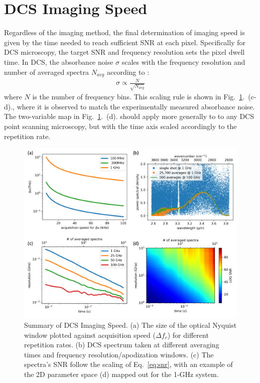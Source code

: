 \documentclass{optica-article}
\begin{document}
\section{DCS Imaging Speed}
Regardless of the imaging method, the final determination of imaging speed is given by the time needed to reach sufficient SNR at each pixel. Specifically for DCS microscopy, the target SNR and frequency resolution sets the pixel dwell time. In DCS, the absorbance noise $\sigma$ scales with the frequency resolution and number of averaged spectra $N_{avg}$ according to \cite{newbury_sensitivity_2010}: 
% 
\begin{align}
    \sigma \propto \frac{N}{\sqrt{N_{avg}}}
    \label{eq:snr}
\end{align}
% 
where $N$ is the number of frequency bins. This scaling rule is shown in Fig.~\ref{fig:snr_analysis}.~(c-d)., where it is observed to match the experimentally measured absorbance noise. The two-variable map in  Fig.~\ref{fig:snr_analysis}.~(d). should apply more generally to to any DCS point scanning microscopy, but with the time axis scaled accordingly to the repetition rate. 

\begin{figure}[h]
    \centering
    \includegraphics[width=\linewidth]{snr_analysis.png}
    \caption{Summary of DCS Imaging Speed. (a) The size of the optical Nyquist window plotted against acquisition speed ($\Delta f_r$) for different repetition rates. (b) DCS spectrum taken at different averaging times and frequency resolution/apodization windows. (c) The spectra's SNR follow the scaling of Eq.~\ref{eq:snr}, with an example of the 2D parameter space (d) mapped out for the 1-GHz system.}
    \label{fig:snr_analysis}
\end{figure}
\end{document}
